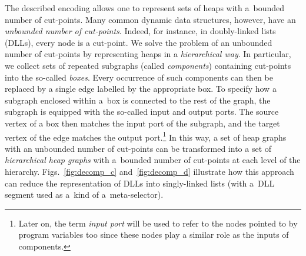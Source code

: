 The described encoding allows one to represent sets of heaps with a~bounded
number of cut-points. Many common dynamic data structures,
however, have an \emph{unbounded number of
cut-points}. Indeed, for instance, in doubly-linked lists (DLLs), every node is
a cut-point. We solve the problem of an unbounded number of cut-points by
representing heaps in a \emph{hierarchical
way}. In particular, we collect sets of repeated subgraphs (called
\emph{components}) containing cut-points into the so-called \emph{boxes}. Every
occurrence of such components can then be replaced by a single edge labelled by
the appropriate box. To specify how a subgraph enclosed within a~box is
connected to the rest of the graph, the subgraph is equipped with the so-called
input and output ports. The source vertex of a box then matches the input port
of the subgraph, and the target vertex of the edge matches the output
port.\footnote{Later on, the term \emph{input port} will be used to refer to the nodes
pointed to by program variables too since these nodes play a similar role as the
inputs of components.} In this way, a set of heap graphs with an unbounded
number of cut-points can be transformed into a set of \emph{hierarchical heap
graphs} with a~bounded number of cut-points at each level of the hierarchy.
Figs.~\ref{fig:decomp_c} and~\ref{fig:decomp_d} illustrate how this approach can
reduce the representation of DLLs into singly-linked lists (with a~DLL segment
used as a~kind of a~meta-selector). 


